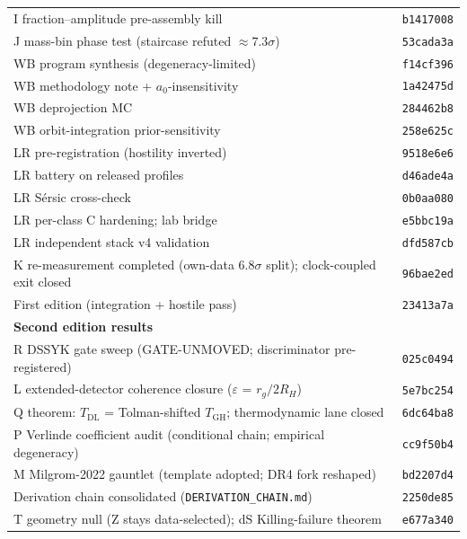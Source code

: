 \documentclass[11pt,a4paper]{article}
\begin{document}
\begin{longtable}{@{}p{11.5cm} l@{}}
\addlinespace
I fraction--amplitude pre-assembly kill & \texttt{b1417008} \\
\addlinespace
J mass-bin phase test (staircase refuted $\approx{}7.3\sigma$) & \texttt{53cada3a} \\
\addlinespace
WB program synthesis (degeneracy-limited) & \texttt{f14cf396} \\
\addlinespace
WB methodology note + $a_{0}$-insensitivity & \texttt{1a42475d} \\
\addlinespace
WB deprojection MC & \texttt{284462b8} \\
\addlinespace
WB orbit-integration prior-sensitivity & \texttt{258e625c} \\
\addlinespace
LR pre-registration (hostility inverted) & \texttt{9518e6e6} \\
\addlinespace
LR battery on released profiles & \texttt{d46ade4a} \\
\addlinespace
LR S\'ersic cross-check & \texttt{0b0aa080} \\
\addlinespace
LR per-class C hardening; lab bridge & \texttt{e5bbc19a} \\
\addlinespace
LR independent stack v4 validation & \texttt{dfd587cb} \\
\addlinespace
K re-measurement completed (own-data $6.8\sigma$ split); clock-coupled exit closed & \texttt{96bae2ed} \\
\addlinespace
First edition (integration + hostile pass) & \texttt{23413a7a} \\
\addlinespace
\textbf{Second edition results} &  \\
\addlinespace
R DSSYK gate sweep (GATE-UNMOVED; discriminator pre-registered) & \texttt{025c0494} \\
\addlinespace
L extended-detector coherence closure ($\varepsilon$ = $r_g/2R_H$) & \texttt{5e7bc254} \\
\addlinespace
Q theorem: $T_{\mathrm{DL}}$ = Tolman-shifted $T_{\mathrm{GH}}$; thermodynamic lane closed & \texttt{6dc64ba8} \\
\addlinespace
P Verlinde coefficient audit (conditional chain; empirical degeneracy) & \texttt{cc9f50b4} \\
\addlinespace
M Milgrom-2022 gauntlet (template adopted; DR4 fork reshaped) & \texttt{bd2207d4} \\
\addlinespace
Derivation chain consolidated (\texttt{DERIVATION\_\allowbreak{}CHAIN.md}) & \texttt{2250de85} \\
\addlinespace
T geometry null (Z stays data-selected); dS Killing-failure theorem & \texttt{e677a340} \\

\end{longtable}
\end{document}
